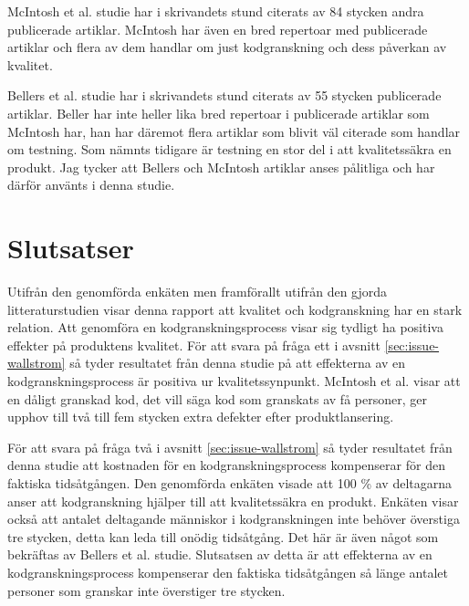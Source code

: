 McIntosh et al. \cite{mcintosh2014impact} studie har i skrivandets stund citerats av 84 stycken andra publicerade artiklar. McIntosh har även en bred repertoar med publicerade artiklar och flera av dem handlar om just kodgranskning och dess påverkan av kvalitet.

Bellers et al. \cite{beller2014modern} studie har i skrivandets stund citerats av 55 stycken publicerade artiklar. Beller har inte heller lika bred repertoar i publicerade artiklar som McIntosh har, han har däremot flera artiklar som blivit väl citerade som handlar om testning. Som nämnts tidigare är testning en stor del i att kvalitetssäkra en produkt. Jag tycker att Bellers och McIntosh artiklar anses pålitliga och har därför använts i denna studie.

\section{Slutsatser}
\label{sec:conclusions-wallstrom}
Utifrån den genomförda enkäten men framförallt utifrån den gjorda litteraturstudien visar denna rapport att kvalitet och kodgranskning har en stark relation. Att genomföra en kodgranskningsprocess visar sig tydligt ha positiva effekter på produktens kvalitet. För att svara på fråga ett i avsnitt \ref{sec:issue-wallstrom} så tyder resultatet från denna studie på att effekterna av en kodgranskningsprocess är positiva ur kvalitetssynpunkt. McIntosh et al. \cite{mcintosh2014impact} visar att en dåligt granskad kod, det vill säga kod som granskats av få personer, ger upphov till två till fem stycken extra defekter efter produktlansering.

För att svara på fråga två i avsnitt \ref{sec:issue-wallstrom} så tyder resultatet från denna studie att kostnaden för en kodgranskningsprocess kompenserar för den faktiska tidsåtgången. Den genomförda enkäten visade att 100 \% av deltagarna anser att kodgranskning hjälper till att kvalitetssäkra en produkt. Enkäten visar också att antalet deltagande människor i kodgranskningen inte behöver överstiga tre stycken, detta kan leda till onödig tidsåtgång. Det här är även något som bekräftas av Bellers et al. \cite{beller2014modern} studie. Slutsatsen av detta är att effekterna av en kodgranskningsprocess kompenserar den faktiska tidsåtgången så länge antalet personer som granskar inte överstiger tre stycken.


